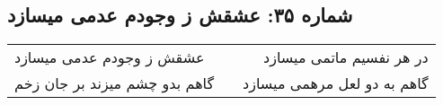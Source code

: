 \begin{center}
\section*{شماره ۳۵: عشقش ز وجودم عدمی میسازد}
\label{sec:035}
\begin{longtable}{l p{0.5cm} r}
عشقش ز وجودم عدمی میسازد
&&
در هر نفسیم ماتمی میسازد
\\
گاهم بدو چشم میزند بر جان زخم
&&
گاهم به دو لعل مرهمی میسازد
\\
\end{longtable}
\end{center}
